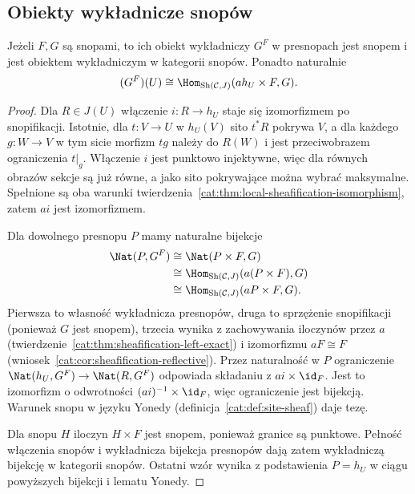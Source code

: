 \subsection{Obiekty wykładnicze snopów}

\begin{twierdzenie}\label{cat:thm:sheaf-exponential}
Jeżeli $F,G$ są snopami, to ich obiekt wykładniczy $G^F$ w presnopach jest snopem i jest obiektem wykładniczym w kategorii snopów. Ponadto naturalnie
\[
 (G^F)(U)\cong
 \Hom_{\operatorname{Sh}(\mathcal C,J)}(a h_U\times F,G).
\]
\end{twierdzenie}
\begin{proof}
Dla $R\in J(U)$ włączenie $i:R\to h_U$ staje się izomorfizmem po snopifikacji. Istotnie, dla $t:V\to U$ w $h_U(V)$ sito $t^*R$ pokrywa $V$, a dla każdego $g:W\to V$ w tym sicie morfizm $tg$ należy do $R(W)$ i jest przeciwobrazem ograniczenia $t|_g$. Włączenie $i$ jest punktowo injektywne, więc dla równych obrazów sekcje są już równe, a jako sito pokrywające można wybrać maksymalne. Spełnione są oba warunki twierdzenia~\ref{cat:thm:local-sheafification-isomorphism}, zatem $ai$ jest izomorfizmem.

Dla dowolnego presnopu $P$ mamy naturalne bijekcje
\[
 \begin{aligned}
 \Nat(P,G^F)&\cong\Nat(P\times F,G)\\
 &\cong\Hom_{\operatorname{Sh}(\mathcal C,J)}(a(P\times F),G)\\
 &\cong\Hom_{\operatorname{Sh}(\mathcal C,J)}(aP\times F,G).
 \end{aligned}
\]
Pierwsza to własność wykładnicza presnopów, druga to sprzężenie snopifikacji (ponieważ $G$ jest snopem), trzecia wynika z zachowywania iloczynów przez $a$ (twierdzenie~\ref{cat:thm:sheafification-left-exact}) i izomorfizmu $aF\cong F$ (wniosek~\ref{cat:cor:sheafification-reflective}). Przez naturalność w $P$ ograniczenie $\Nat(h_U,G^F)\to\Nat(R,G^F)$ odpowiada składaniu z $ai\times\id_F$. Jest to izomorfizm o odwrotności $(ai)^{-1}\times\id_F$, więc ograniczenie jest bijekcją. Warunek snopu w języku Yonedy (definicja~\ref{cat:def:site-sheaf}) daje tezę.

Dla snopu $H$ iloczyn $H\times F$ jest snopem, ponieważ granice są punktowe. Pełność włączenia snopów i wykładnicza bijekcja presnopów dają zatem wykładniczą bijekcję w kategorii snopów. Ostatni wzór wynika z podstawienia $P=h_U$ w ciągu powyższych bijekcji i lematu Yonedy.
\end{proof}

